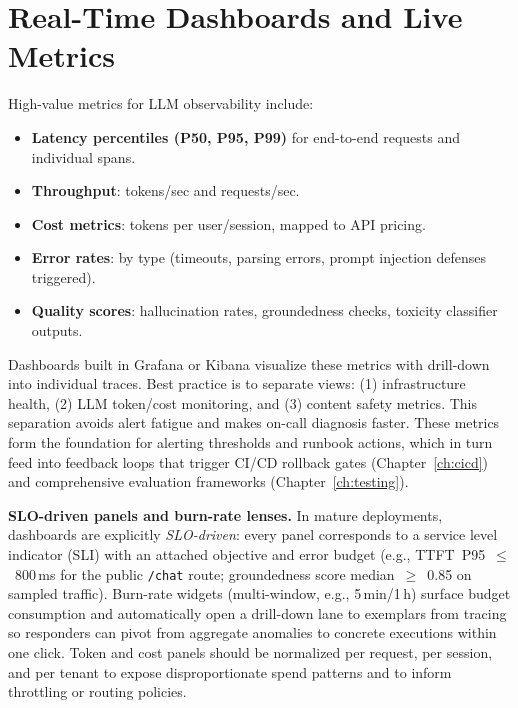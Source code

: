 \section{Real-Time Dashboards and Live Metrics}
\label{sec:real-time-dashboards-and-live-metrics}
High-value metrics for LLM observability include:
\begin{itemize}
    \item \textbf{Latency percentiles (P50, P95, P99)} for end-to-end requests and individual spans.
    \item \textbf{Throughput}: tokens/sec and requests/sec.
    \item \textbf{Cost metrics}: tokens per user/session, mapped to API pricing.
    \item \textbf{Error rates}: by type (timeouts, parsing errors, prompt injection defenses triggered).
    \item \textbf{Quality scores}: hallucination rates, groundedness checks, toxicity classifier outputs.
\end{itemize}

Dashboards built in Grafana \cite{grafana_dashboards} or Kibana visualize these metrics with drill-down into individual traces. Best practice is to separate views: (1) infrastructure health, (2) LLM token/cost monitoring, and (3) content safety metrics. This separation avoids alert fatigue and makes on-call diagnosis faster. These metrics form the foundation for alerting thresholds and runbook actions, which in turn feed into feedback loops that trigger CI/CD rollback gates (Chapter~\ref{ch:cicd}) and comprehensive evaluation frameworks (Chapter~\ref{ch:testing}).

\medskip
\noindent

\medskip
\noindent\textbf{SLO-driven panels and burn-rate lenses.}
In mature deployments, dashboards are explicitly \emph{SLO-driven}: every panel corresponds to a service level indicator (SLI) with an attached objective and error budget (e.g., TTFT~P95~$\leq$~800\,ms for the public \texttt{/chat} route; groundedness score median~$\geq$~0.85 on sampled traffic). Burn-rate widgets (multi-window, e.g., 5\,min/1\,h) surface budget consumption and automatically open a drill-down lane to exemplars from tracing so responders can pivot from aggregate anomalies to concrete executions within one click. Token and cost panels should be normalized per request, per session, and per tenant to expose disproportionate spend patterns and to inform throttling or routing policies.

